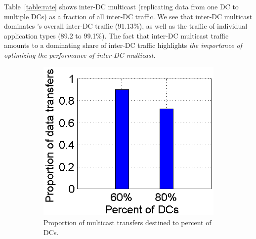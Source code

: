 Table~\ref{table:rate} shows inter-DC multicast (replicating data
from one DC to multiple DCs) as a fraction of all inter-DC traffic.
We see that inter-DC multicast dominates \company's overall inter-DC
traffic (91.13\%), as well as the traffic of individual application
types (89.2 to 99.1\%). The fact that inter-DC multicast traffic
amounts to a dominating share of inter-DC traffic highlights {\em the
importance of optimizing the performance of inter-DC multicast.}

\begin{figure}[t]
        \centering
        \begin{subfigure}[b]{0.23\textwidth}
                \centering
                \includegraphics[width=\textwidth]{images/destinationDC_v2.eps}%
                \caption{Proportion of multicast transfers destined to percent of DCs.}
                \label{fig:bulk:dest}
        \end{subfigure}
	\hspace{0.1cm}
        \begin{subfigure}[b]{0.23\textwidth}
                \centering

\end{subfigure}
\end{figure}
